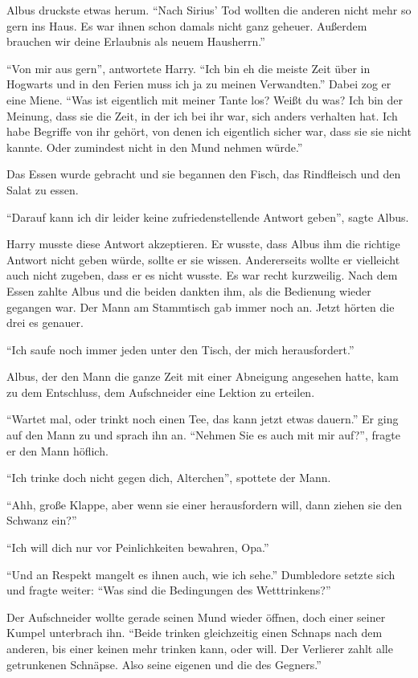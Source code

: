 Albus druckste etwas herum. \enquote{Nach Sirius’ Tod wollten die anderen nicht mehr so gern ins Haus. Es war ihnen schon damals nicht ganz geheuer. Außerdem brauchen wir deine Erlaubnis als neuem Hausherrn.}

\enquote{Von mir aus gern}, antwortete Harry. \enquote{Ich bin eh die meiste Zeit über in Hogwarts und in den Ferien muss ich ja zu meinen Verwandten.} Dabei zog er eine Miene. \enquote{Was ist eigentlich mit meiner Tante los? Weißt du was? Ich bin der Meinung, dass sie die Zeit, in der ich bei ihr war, sich anders verhalten hat. Ich habe Begriffe von ihr gehört, von denen ich eigentlich sicher war, dass sie sie nicht kannte. Oder zumindest nicht in den Mund nehmen würde.}

Das Essen wurde gebracht und sie begannen den Fisch, das Rindfleisch und den Salat zu essen.

\enquote{Darauf kann ich dir leider keine zufriedenstellende Antwort geben}, sagte Albus.

Harry musste diese Antwort akzeptieren. Er wusste, dass Albus ihm die richtige Antwort nicht geben würde, sollte er sie wissen. Andererseits wollte er vielleicht auch nicht zugeben, dass er es nicht wusste. Es war recht kurzweilig. Nach dem Essen zahlte Albus und die beiden dankten ihm, als die Bedienung wieder gegangen war. Der Mann am Stammtisch gab immer noch an. Jetzt hörten die drei es genauer.

\enquote{Ich saufe noch immer jeden unter den Tisch, der mich herausfordert.}

Albus, der den Mann die ganze Zeit mit einer Abneigung angesehen hatte, kam zu dem Entschluss, dem Aufschneider eine Lektion zu erteilen.

\enquote{Wartet mal, oder trinkt noch einen Tee, das kann jetzt etwas dauern.} Er ging auf den Mann zu und sprach ihn an. \enquote{Nehmen Sie es auch mit mir auf?}, fragte er den Mann höflich.

\enquote{Ich trinke doch nicht gegen dich, Alterchen}, spottete der Mann.

\enquote{Ahh, große Klappe, aber wenn sie einer herausfordern will, dann ziehen sie den Schwanz ein?}

\enquote{Ich will dich nur vor Peinlichkeiten bewahren, Opa.}

\enquote{Und an Respekt mangelt es ihnen auch, wie ich sehe.} Dumbledore setzte sich und fragte weiter: \enquote{Was sind die Bedingungen des Wetttrinkens?}

Der Aufschneider wollte gerade seinen Mund wieder öffnen, doch einer seiner Kumpel unterbrach ihn. \enquote{Beide trinken gleichzeitig einen Schnaps nach dem anderen, bis einer keinen mehr trinken kann, oder will. Der Verlierer zahlt alle getrunkenen Schnäpse. Also seine eigenen und die des Gegners.}

